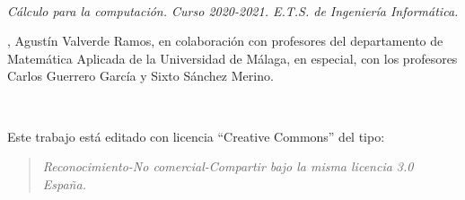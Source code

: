 \pagestyle{plain}
\ 
\vfill
\hspace{-3.5cm}
\begin{minipage}{1.2\textwidth}\small
	
\noindent\emph{Cálculo para la computación. Curso 2020-2021. E.T.S. de Ingeniería Informática.}

\noindent{}, Agustín Valverde Ramos, en colaboración con profesores del departamento de Matemática Aplicada de la Universidad de Málaga, en especial, con los profesores Carlos Guerrero García y Sixto Sánchez Merino.

\

\noindent
Este trabajo está editado con licencia ``Creative Commons'' del tipo:
\begin{quote}
\em
Reconocimiento-No comercial-Compartir bajo la misma licencia 3.0 España.
\end{quote}


\end{minipage}
